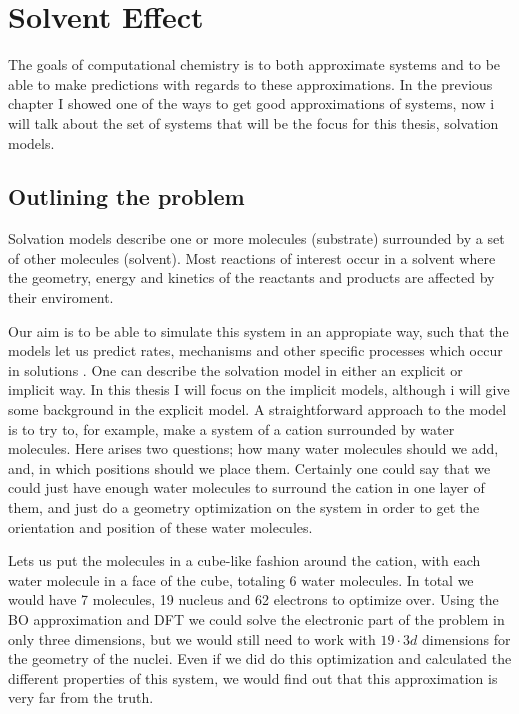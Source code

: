 \documentclass[../master_thesis.tex]{subfiles}
\begin{document}
\chapter{Solvent Effect}
The goals of computational chemistry is to both approximate systems and to be
able to make predictions with regards to these approximations. In the previous
chapter I showed one of the ways to get good approximations of systems, now i
will talk about the set of systems that will be the focus for this thesis,
solvation models.
\section{Outlining the problem}
Solvation models describe one or more molecules (substrate) surrounded by
a set of other molecules (solvent). Most reactions of interest occur in a
solvent where the geometry, energy and kinetics of the reactants and products
are affected by their enviroment\cite{Mennucci:2018}.

Our aim is to be able to simulate this system in an appropiate way, such that
the models let us predict rates, mechanisms and other specific processes which
occur in solutions \cite{Tomasi:1994wt}.
One can describe the solvation model in either an explicit or implicit way. In
this thesis I will focus on the implicit models, although i will give some
background in the explicit model.
A straightforward approach to the model is to try to, for example, make a
system of a  cation surrounded by water molecules. Here arises two
questions; how many water molecules should we add, and, in which positions
should we place them. Certainly one could say that we could just have enough
water molecules to surround the cation in one layer of them,  and just do a
geometry optimization \cite{Jensen:2017} on the system in order to get the
orientation and position of these water molecules.

Lets us put the molecules in a cube-like fashion around the cation, with each
water molecule in a face of the cube, totaling 6 water molecules. In total we
would have 7 molecules, 19 nucleus and 62 electrons to optimize over. Using the
\ac{BO} approximation and \ac{DFT} we could solve the electronic part of the
problem in only three dimensions, but we would still need to work with
$19\cdot3d$ dimensions for the geometry of the nuclei. Even if we did do this
optimization and calculated the different properties of this system, we would
find out that this approximation is very far from the truth.
\end{document}
